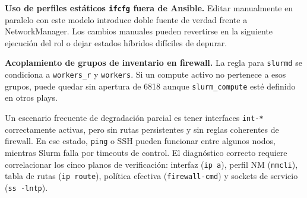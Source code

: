 \begin{criticalnote}
\textbf{Uso de perfiles estáticos \texttt{ifcfg} fuera de Ansible.} Editar manualmente  en paralelo con este modelo introduce doble fuente de verdad frente a NetworkManager. Los cambios manuales pueden revertirse en la siguiente ejecución del rol o dejar estados híbridos difíciles de depurar.
\end{criticalnote}

\begin{criticalnote}
\textbf{Acoplamiento de grupos de inventario en firewall.} La regla para \texttt{slurmd} se condiciona a \texttt{workers\_r} y \texttt{workers}. Si un compute activo no pertenece a esos grupos, puede quedar sin apertura de 6818 aunque \texttt{slurm\_compute} esté definido en otros plays.
\end{criticalnote}

Un escenario frecuente de degradación parcial es tener interfaces \texttt{int-*} correctamente activas, pero sin rutas persistentes y sin reglas coherentes de firewall. En ese estado, \texttt{ping} o SSH pueden funcionar entre algunos nodos, mientras Slurm falla por timeouts de control. El diagnóstico correcto requiere correlacionar los cinco planos de verificación: interfaz (\texttt{ip a}), perfil NM (\texttt{nmcli}), tabla de rutas (\texttt{ip route}), política efectiva (\texttt{firewall-cmd}) y sockets de servicio (\texttt{ss -lntp}).
